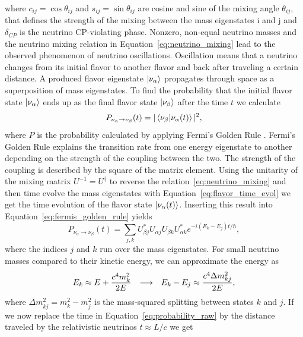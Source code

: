 where $c_{ij}=\cos\theta_{ij}$ and $s_{ij}=\sin\theta_{ij}$ are cosine and sine of the mixing angle $\theta_{ij}$, that defines the strength of the mixing between the mass eigenstates i and j and $\delta_{CP}$ is the neutrino CP-violating phase.
Nonzero, non-equal neutrino masses and the neutrino mixing relation in Equation~\eqref{eq:neutrino_mixing} lead to the observed phenomenon of neutrino oscillations.
Oscillation means that a neutrino changes from its initial flavor to another flavor and back after traveling a certain distance.
A produced flavor eigenstate $\ket{\nu_\alpha}$ propagates through space as a superposition of mass eigenstates.
To find the probability that the initial flavor state $\ket{\nu_\alpha}$ ends up as the final flavor state $\ket{\nu_\beta}$ after the time $t$ we calculate
\begin{equation}
    P_{\nu_\alpha \rightarrow \nu_\beta}(t)
    =
    |\braket{\nu_\beta|\nu_\alpha(t)}|^2,
    \label{eq:fermis_golden_rule}
\end{equation}
where $P$ is the probability calculated by applying Fermi's Golden Rule \cite{1927RSPSA.114..243D}.
Fermi's Golden Rule explains the transition rate from one energy eigenstate to another depending on the strength of the coupling between the two.
The strength of the coupling is described by the square of the matrix element.
Using the unitarity of the mixing matrix $U^{-1}=U^\dagger$ to reverse the relation~\eqref{eq:neutrino_mixing} and then time evolve the mass eigenstates with Equation~\eqref{eq:flavor_time_evol} we get the time evolution of the flavor state $\ket{\nu_\alpha(t)}$.
Inserting this result into Equation~\ref{eq:fermis_golden_rule} yields
\begin{equation}
    P_{\nu_\alpha \rightarrow \nu_\beta}(t)
    =
    \sum_{j,k}U^*_{\beta j}U_{\alpha j}U_{\beta k}U^*_{\alpha k}e^{-i(E_k-E_j)t/\hbar},
    \label{eq:probability_raw}
\end{equation}
where the indices $j$ and $k$ run over the mass eigenstates. For small neutrino masses compared to their kinetic energy, we can approximate the energy as
\begin{equation}
    E_k \approx E+\frac{c^4m^2_k}{2E} \hspace{0.25cm} \longrightarrow \hspace{0.25cm} E_k-E_j \approx \frac{c^4\Delta m^2_{kj}}{2E},
\end{equation}
where $\Delta m^2_{kj}=m^2_k-m^2_j$ is the mass-squared splitting between states $k$ and $j$.
If we now replace the time in Equation~\eqref{eq:probability_raw} by the distance traveled by the relativistic neutrinos $t\approx L/c$ we get
